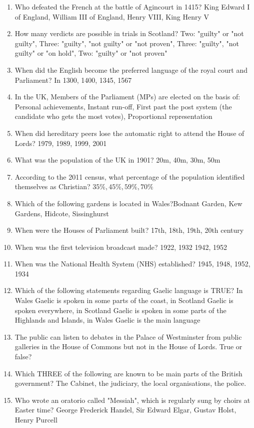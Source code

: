 \documentclass{amsart}
\begin{document}
\begin{enumerate}
	\item Who defeated the French at the battle of Agincourt in 1415? King Edward I of England, William III of England, Henry VIII, King Henry V
	\item How many verdicts are possible in trials in Scotland? Two: "guilty" or "not guilty", Three:  "guilty", "not guilty" or "not proven", Three:  "guilty", "not guilty" or "on hold", Two:  "guilty" or "not proven"
	\item When did the English become the preferred language of the royal court and Parliament? In 1300, 1400, 1345, 1567
	\item In the UK, Members of the Parliament (MPs) are elected on the basis of: Personal achievements, Instant run-off, First past the post system (the candidate who gets the most votes), Proportional representation
	\item When did hereditary peers lose the automatic right to attend the House of Lords? 1979, 1989, 1999, 2001
	\item What was the population of the UK in 1901? 20m, 40m, 30m, 50m
	\item According to the 2011 census, what percentage of the population identified themselves as Christian? $35\%, 45\%, 59\%, 70\%$
	\item Which of the following gardens is located in Wales?Bodnant Garden, Kew Gardens, Hidcote, Sissinghurst
	\item When were the Houses of Parliament built? 17th, 18th, 19th, 20th century
	\item When was the first television broadcast made? 1922, 1932 1942, 1952
	\item When was the National Health System (NHS) established? 1945, 1948, 1952, 1934
	\item Which of the following statements regarding Gaelic language is TRUE? In Wales Gaelic is spoken in some parts of the coast, in Scotland Gaelic is spoken everywhere, in Scotland Gaelic is spoken in some parts of the Highlands and Islands, in Wales Gaelic is the main language                      
	\item The public can listen to debates in the Palace of Westminster from public galleries in the House of Commons but not in the House of Lords. True or false?             
	\item Which THREE of the following are known to be main parts of the British government? The Cabinet, the judiciary, the local organisations, the police.               
	\item Who wrote an oratorio called "Messiah", which is regularly sung by choirs at Easter time? George Frederick Handel, Sir Edward Elgar, Gustav Holst, Henry Purcell       

\end{enumerate}
\end{document}
